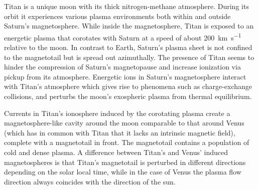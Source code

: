 \documentclass[12pt, parskip=full*, abstract]{scrartcl}
\begin{document}
Titan is a unique moon with its thick nitrogen-methane atmosphere. During its orbit it experiences various plasma environments both within and outside Saturn's magnetosphere. While inside the magnetosphere, Titan is exposed to an energetic plasma that corotates with Saturn at a speed of about \SI{200}{\kilo\metre\per\second} relative to the moon. In contrast to Earth, Saturn's plasma sheet is not confined to the magnetotail but is spread out azimuthally. The presence of Titan seems to hinder the compression of Saturn's magnetopause and increase ionization via pickup from its atmosphere. Energetic ions in Saturn's magnetosphere interact with Titan's atmosphere which gives rise to phenomena such as charge-exchange collisions, and perturbs the moon's exospheric plasma from thermal equilibrium. 

Currents in Titan's ionosphere induced by the corotating plasma create a magnetosphere-like cavity around the moon comparable to that around Venus (which has in common with Titan that it lacks an intrinsic magnetic field), complete with a magnetotail in front. The magnetotail contains a population of cold and dense plasma. A difference between Titan's and Venus' induced magnetospheres is that Titan's magnetotail is perturbed in different directions depending on the solar local time, while in the case of Venus the plasma flow direction always coincides with the direction of the sun. 


\newpage
\printbibliography
\end{document}
